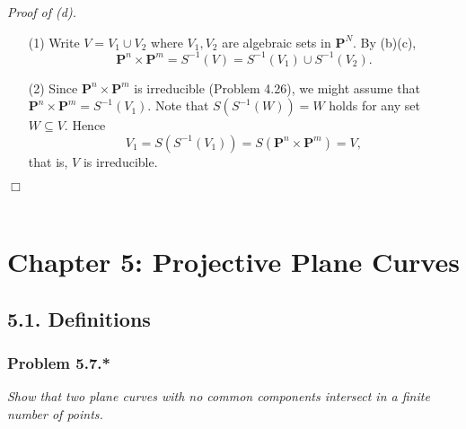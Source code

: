 \documentclass{article}
\begin{document}
\emph{Proof of (d).}
\begin{enumerate}
\item[(1)]
  Write $V = V_1 \cup V_2$ where $V_1, V_2$ are algebraic sets in $\mathbf{P}^{N}$.
  By (b)(c),
  \[
    \mathbf{P}^{n} \times \mathbf{P}^{m}
    = S^{-1}(V)
    = S^{-1}(V_1) \cup S^{-1}(V_2).
  \]

\item[(2)]
  Since $\mathbf{P}^{n} \times \mathbf{P}^{m}$ is irreducible (Problem 4.26),
  we might assume that $\mathbf{P}^{n} \times \mathbf{P}^{m} = S^{-1}(V_1)$.
  Note that $S(S^{-1}(W)) = W$ holds for any set $W \subseteq V$.
  Hence
  \[
    V_1 = S(S^{-1}(V_1)) = S(\mathbf{P}^{n} \times \mathbf{P}^{m}) = V,
  \]
  that is, $V$ is irreducible.
\end{enumerate}
$\Box$ \\\\






\newpage
\section*{Chapter 5: Projective Plane Curves\\}



\subsection*{5.1. Definitions \\}






\subsubsection*{Problem 5.7.*}
\emph{Show that two plane curves with no common components intersect in
a finite number of points.} \\
\end{document}
